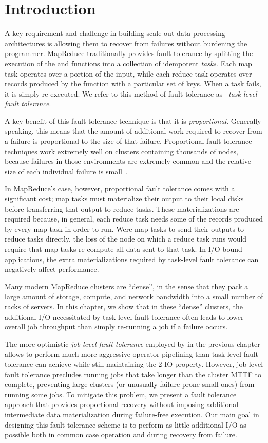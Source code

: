 \section{Introduction}

A key requirement and challenge in building scale-out data processing
architectures is allowing them to recover from failures without burdening the
programmer. MapReduce traditionally provides fault tolerance by splitting the
execution of the \map and \reduce functions into a collection of idempotent
\emph{tasks}. Each map task operates over a portion of the input, while each
reduce task operates over records produced by the \map function with a
particular set of keys. When a task fails, it is simply re-executed. We refer
to this method of fault tolerance as ~\emph{task-level fault tolerance}.

A key benefit of this fault tolerance technique is that it is
\emph{proportional}. Generally speaking, this means that the amount of
additional work required to recover from a failure is proportional to the size
of that failure. Proportional fault tolerance techniques work extremely well on
clusters containing thousands of nodes, because failures in those environments
are extremely common and the relative size of each individual failure is
small~\cite{jeff-dean-talk}.

In MapReduce's case, however, proportional fault tolerance comes with a
significant cost; map tasks must materialize their output to their local disks
before transferring that output to reduce tasks. These materializations are
required because, in general, each reduce task needs some of the records
produced by every map task in order to run. Were map tasks to send their
outputs to reduce tasks directly, the loss of the node on which a reduce
task runs would require that map tasks re-compute all data sent to that
task. In I/O-bound applications, the extra materializations required by
task-level fault tolerance can negatively
affect performance.

Many modern MapReduce clusters are ``dense'', in the sense that they pack a
large amount of storage, compute, and network bandwidth into a small number of
racks of servers. In this chapter, we show that in these ``dense'' clusters,
the additional I/O necessitated by task-level fault tolerance often leads to
lower overall job throughput than simply re-running a job if a failure
occurs.

The more optimistic \emph{job-level fault tolerance} employed by \themis in the
previous chapter allows \themis to perform much more aggressive operator
pipelining than task-level fault tolerance can achieve while still maintaining
the 2-IO property. However, job-level fault tolerance precludes running jobs
that take longer than the cluster MTTF to complete, preventing large clusters
(or unusually failure-prone small ones) from running some jobs.  To mitigate
this problem, we present a fault tolerance approach that provides proportional
recovery without imposing additional intermediate data materialization during
failure-free execution. Our main goal in designing this fault tolerance scheme
is to perform as little additional I/O as possible both in common case
operation and during recovery from failure.

